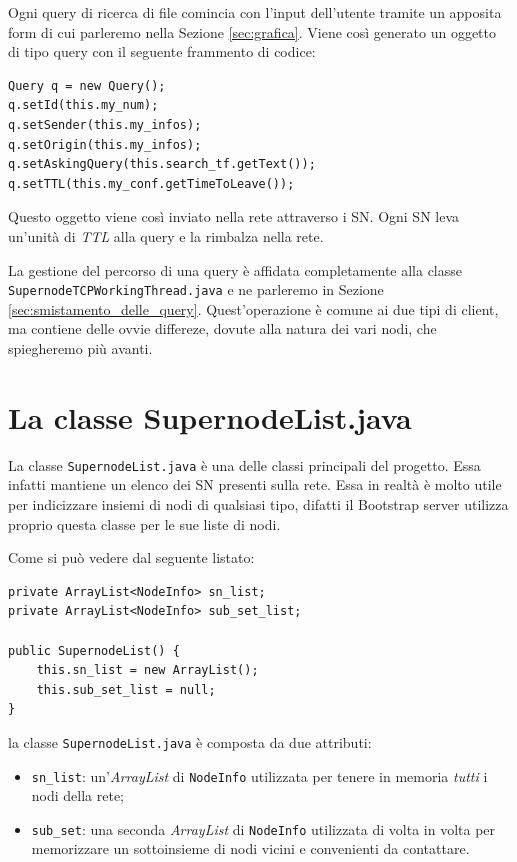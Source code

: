 Ogni query di ricerca di file comincia con l'input dell'utente tramite un apposita form di cui parleremo nella Sezione \ref{sec:grafica}.
Viene così generato un oggetto di tipo query con il seguente frammento di codice:
\begin{lstlisting}
Query q = new Query();
q.setId(this.my_num);
q.setSender(this.my_infos);
q.setOrigin(this.my_infos);
q.setAskingQuery(this.search_tf.getText());
q.setTTL(this.my_conf.getTimeToLeave());
\end{lstlisting}
Questo oggetto viene così inviato nella rete attraverso i SN.
Ogni SN leva un'unità di \emph{TTL} alla query e la rimbalza nella rete.

La gestione del percorso di una query è affidata completamente alla classe \verb|SupernodeTCPWorkingThread.java| e ne parleremo in Sezione \ref{sec:smistamento_delle_query}.
Quest'operazione è comune ai due tipi di client, ma contiene delle ovvie differeze, dovute alla natura dei vari nodi, che spiegheremo più avanti.

\section{La classe SupernodeList.java}
La classe \verb|SupernodeList.java| è una delle classi principali del progetto. Essa infatti mantiene un elenco dei SN presenti sulla rete.
Essa in realtà è molto utile per indicizzare insiemi di nodi di qualsiasi tipo, difatti il Bootstrap server utilizza proprio questa classe per le sue liste di nodi.

Come si può vedere dal seguente listato:
\begin{lstlisting}
private ArrayList<NodeInfo> sn_list;
private ArrayList<NodeInfo> sub_set_list;

public SupernodeList() {
	this.sn_list = new ArrayList();
	this.sub_set_list = null;
}
\end{lstlisting}

la classe \verb|SupernodeList.java| è composta da due attributi:
\begin{itemize}
 \item \verb|sn_list|:
un'\emph{ArrayList} di \verb|NodeInfo| utilizzata per tenere in memoria \emph{tutti} i nodi della rete;

 \item \verb|sub_set|:
una seconda \emph{ArrayList} di \verb|NodeInfo| utilizzata di volta in volta per memorizzare un sottoinsieme di nodi vicini e convenienti da contattare.
\end{itemize}

